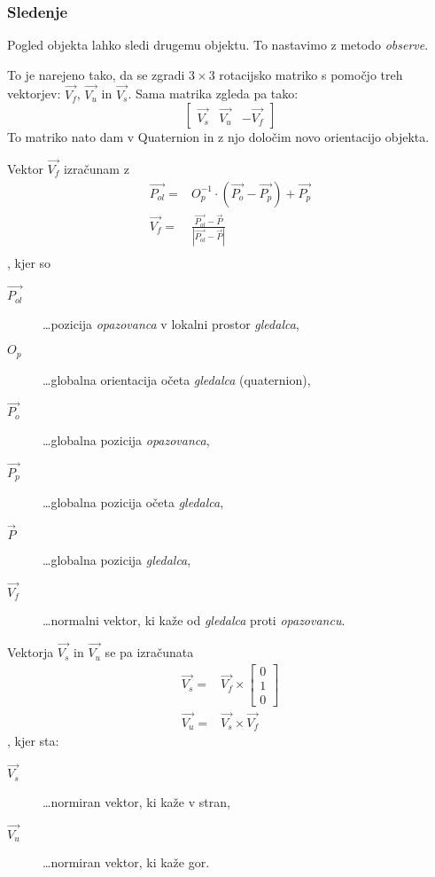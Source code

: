 \documentclass[a4paper]{article}
\begin{document}
\subsubsection{Sledenje}
Pogled objekta lahko sledi drugemu objektu. To nastavimo z metodo \emph{observe}.

To je narejeno tako, da se zgradi $3 \times 3$ rotacijsko matriko s pomočjo treh vektorjev: $\overrightarrow{V_f}$, $\overrightarrow{V_u}$ in $\overrightarrow{V_s}$. Sama matrika zgleda pa tako:
$$
\left[ \begin{array}{ccc}
\overrightarrow{V_s} & \overrightarrow{V_u} & - \overrightarrow{V_f}
\end{array} \right]
$$
To matriko nato dam v Quaternion in z njo določim novo orientacijo objekta.

Vektor $\overrightarrow{V_f}$ izračunam z
\begin{eqnarray*}
\overrightarrow{P_{ol}} =& O_p^{-1} \cdot (\overrightarrow{P_o} - \overrightarrow{P_p}) + \overrightarrow{P_p} \\
\overrightarrow{V_f} =& \frac{\overrightarrow{P_{ol}} - \overrightarrow{P}}{\left| \overrightarrow{P_{ol}} - \overrightarrow{P} \right|} \\
\end{eqnarray*},
kjer so
\begin{description}
  \item[$\overrightarrow{P_{ol}}$] \dots pozicija \emph{opazovanca} v lokalni prostor \emph{gledalca},
  \item[$O_p$] \dots globalna orientacija očeta \emph{gledalca} (quaternion),
  \item[$\overrightarrow{P_o}$] \dots globalna pozicija \emph{opazovanca},
  \item[$\overrightarrow{P_p}$] \dots globalna pozicija očeta \emph{gledalca},
  \item[$\overrightarrow{P}$] \dots globalna pozicija \emph{gledalca},
  \item[$\overrightarrow{V_f}$] \dots normalni vektor, ki kaže od \emph{gledalca} proti \emph{opazovancu}.
\end{description}

Vektorja $\overrightarrow{V_s}$ in $\overrightarrow{V_u}$ se pa izračunata
\begin{eqnarray*}
\overrightarrow{V_s} =& \overrightarrow{V_f} \times \left[\begin{array}{c}0\\1\\ 0\end{array}\right] \\
\overrightarrow{V_u} =& \overrightarrow{V_s} \times \overrightarrow{V_f}
\end{eqnarray*},
kjer sta:
\begin{description}
  \item[$\overrightarrow{V_s}$] \dots normiran vektor, ki kaže v stran,
  \item[$\overrightarrow{V_u}$] \dots normiran vektor, ki kaže gor.
\end{description}
\end{document}
